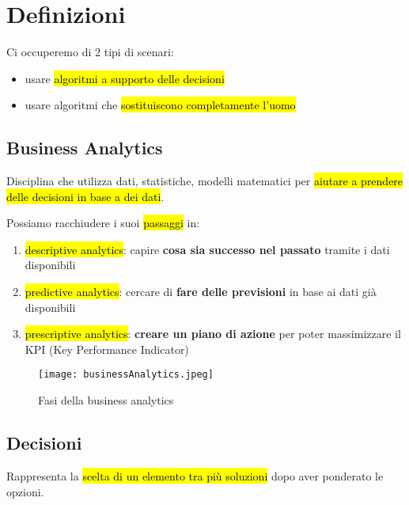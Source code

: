 \section{Definizioni}

Ci occuperemo di 2 tipi di scenari:
\begin{itemize}
	\item usare \hl{algoritmi a supporto delle decisioni}
	\item usare algoritmi che \hl{sostituiscono completamente l'uomo}
\end{itemize}


\subsection{Business Analytics}

Disciplina che utilizza dati, statistiche, modelli matematici per \hl{aiutare a prendere delle decisioni in base a dei dati}.

Possiamo racchiudere i suoi \hl{passaggi} in:
\begin{enumerate}
	\item \hl{descriptive analytics}: capire \textbf{cosa sia successo nel passato} tramite i dati disponibili
	\item \hl{predictive analytics}: cercare di \textbf{fare delle previsioni} in base ai dati già disponibili
	\item \hl{prescriptive analytics}: \textbf{creare un piano di azione} per poter massimizzare il KPI (Key Performance Indicator)
\end{enumerate}

\begin{figure}[H]
\centering
\texttt{[image: businessAnalytics.jpeg]}
\caption{Fasi della business analytics} 
\label{busana}
\end{figure}


\subsection{Decisioni}

Rappresenta la \hl{scelta di un elemento tra più soluzioni} dopo aver ponderato le opzioni.

